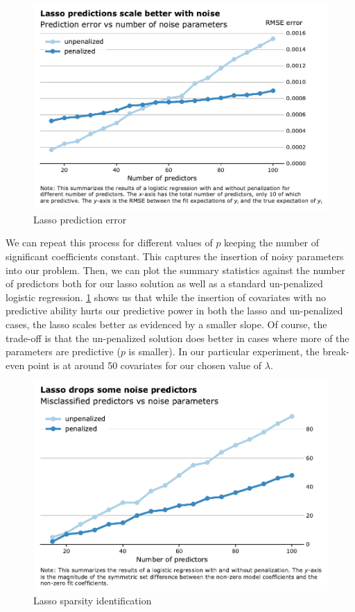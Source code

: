 \documentclass[letterpaper, 12pt]{article}
\begin{document}
\begin{figure}[tbh]
\centering
\includegraphics[width=.8\textwidth]{figs/lasso-pred-error}
\caption{Lasso prediction error}
\label{fig:lasso-pred-err}
\end{figure}

We can repeat this process for different values of $p$ keeping the number of
significant coefficients constant. This captures the insertion of noisy
parameters into our problem. Then, we can plot the summary statistics against
the number of predictors both for our lasso solution as well as a standard
un-penalized logistic regression. \cref{fig:lasso-pred-err} shows us that while
the insertion of covariates with no predictive ability hurts our predictive
power in both the lasso and un-penalized cases, the lasso scales better as
evidenced by a smaller slope. Of course, the trade-off is that the un-penalized
solution does better in cases where more of the parameters are predictive ($p$
is smaller). In our particular experiment, the break-even point is at around 50
covariates for our chosen value of $\lambda$.

\begin{figure}[tbh]
\centering
\includegraphics[width=.8\textwidth]{figs/lasso-symm-diff}
\caption{Lasso sparsity identification}
\label{fig:lasso-symm-diff}
\end{figure}
\end{document}
